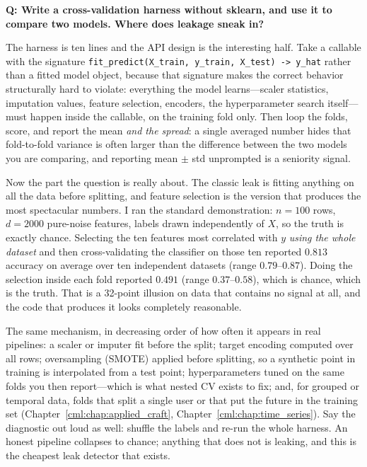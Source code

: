 \begin{interviewq}
\textbf{Q: Write a cross-validation harness without sklearn, and use it to compare two models. Where does leakage sneak in?}

 \quad {} \quad \badgefreq{\freqmed}

\stronganswer

The harness is ten lines and the API design is the interesting half. Take a callable with the signature \texttt{fit\_predict(X\_train, y\_train, X\_test) -> y\_hat} rather than a fitted model object, because that signature makes the correct behavior structurally hard to violate: everything the model learns---scaler statistics, imputation values, feature selection, encoders, the hyperparameter search itself---must happen inside the callable, on the training fold only. Then loop the folds, score, and report the mean \emph{and the spread}: a single averaged number hides that fold-to-fold variance is often larger than the difference between the two models you are comparing, and reporting mean $\pm$ std unprompted is a seniority signal.

Now the part the question is really about. The classic leak is fitting anything on all the data before splitting, and feature selection is the version that produces the most spectacular numbers. I ran the standard demonstration: $n = 100$ rows, $d = 2000$ pure-noise features, labels drawn independently of $X$, so the truth is exactly chance. Selecting the ten features most correlated with $y$ \emph{using the whole dataset} and then cross-validating the classifier on those ten reported $0.813$ accuracy on average over ten independent datasets (range $0.79$--$0.87$). Doing the selection inside each fold reported $0.491$ (range $0.37$--$0.58$), which is chance, which is the truth. That is a 32-point illusion on data that contains no signal at all, and the code that produces it looks completely reasonable.

The same mechanism, in decreasing order of how often it appears in real pipelines: a scaler or imputer fit before the split; target encoding computed over all rows; oversampling (SMOTE) applied before splitting, so a synthetic point in training is interpolated from a test point; hyperparameters tuned on the same folds you then report---which is what nested CV exists to fix; and, for grouped or temporal data, folds that split a single user or that put the future in the training set (Chapter~\ref{cml:chap:applied_craft}, Chapter~\ref{cml:chap:time_series}). Say the diagnostic out loud as well: shuffle the labels and re-run the whole harness. An honest pipeline collapses to chance; anything that does not is leaking, and this is the cheapest leak detector that exists.


\end{interviewq}
